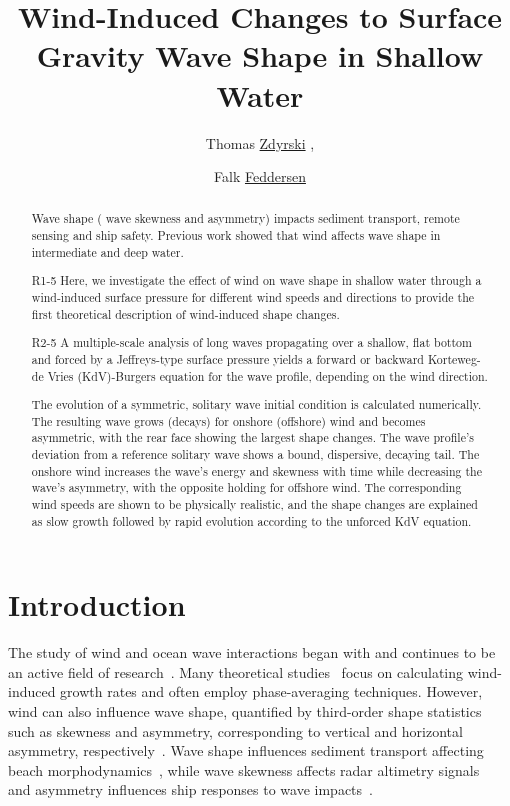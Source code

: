 \documentclass{jfm}
\title{Wind-Induced Changes to Surface Gravity Wave Shape in Shallow Water}
\author{Thomas \href{https://orcid.org/0000-0003-3039-172X}{Zdyrski}\aff{1}
  \corresp{\email{tzdyrski@uscd.edu}},
  \and Falk \href{https://orcid.org/0000-0002-5488-9074}{Feddersen}\aff{1}}
\affiliation{\aff{1}Scripps Institution of Oceanography, UCSD, La Jolla, CA 92092-0209, USA}
\begin{document}
\maketitle

\begin{abstract}
Wave shape (\eg{} wave skewness and asymmetry) impacts sediment
transport, remote sensing and ship safety.
Previous work showed that wind affects wave shape in intermediate and
deep water.
\begin{LineLabel}{R1-5}
Here, we investigate the effect of wind on wave shape in shallow water
through a wind-induced surface pressure for different wind speeds and
directions to provide the first theoretical description of wind-induced
shape changes.
\end{LineLabel}
\begin{LineLabel}{R2-5}
A multiple-scale analysis of long waves propagating over a shallow,
flat bottom and forced by a Jeffreys-type surface pressure yields a
forward or backward Korteweg-de Vries (KdV)-Burgers equation for the
wave profile, depending on the wind direction.
\end{LineLabel}
The evolution of a symmetric, solitary wave initial condition is
calculated numerically.
The resulting wave grows (decays) for onshore (offshore) wind and
becomes asymmetric, with the rear face showing the largest shape
changes.
The wave profile's deviation from a reference solitary wave shows a
bound, dispersive, decaying tail.
The onshore wind increases the wave's energy and skewness with time
while decreasing the wave's asymmetry, with the opposite holding for
offshore wind.
The corresponding wind speeds are shown to be physically realistic, and
the shape changes are explained as slow growth followed by rapid
evolution according to the unforced KdV equation.
\end{abstract}

\section{\label{sec:introduction} Introduction}

The study of wind and ocean wave interactions began with
\citet{jeffreys1925formation} and continues to be an active field of
research~\citep[\eg][]{janssen1991quasi,donelan2006wave,sulivan2010dynamics}.
Many theoretical
studies~\citep[\eg][]{jeffreys1925formation,miles1957generation,phillips1957generation}
focus on calculating wind-induced growth rates and often employ
phase-averaging techniques.
However, wind can also influence wave shape, quantified by third-order
shape statistics such as skewness and asymmetry, corresponding to
vertical and horizontal asymmetry,
respectively~\citep[\eg][]{leykin1995asymmetry,feddersen2005wind,zdyrski2020wind}.
Wave shape influences sediment transport affecting beach
morphodynamics~\citep[\eg][]{drake2001discrete,hoefel2003wave}, while
wave skewness affects radar altimetry
signals~\citep[\eg][]{hayne1980radar} and asymmetry influences ship
responses to wave impacts~\citep[\eg][]{soares2008abnormal}.
\end{document}
